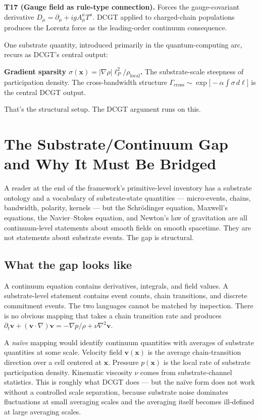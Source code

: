 \documentclass[11pt,a4paper]{article}
\begin{document}
\textbf{T17 (Gauge field as rule-type connection).} Forces the gauge-covariant derivative $D_\mu = \partial_\mu + igA_\mu^a T^a$. DCGT applied to charged-chain populations produces the Lorentz force as the leading-order continuum consequence.

One substrate quantity, introduced primarily in the quantum-computing arc, recurs as DCGT's central output:

\textbf{Gradient sparsity $\sigma(\mathbf{x}) = |\nabla\rho|\ell_P^2/\rho_{\mathrm{local}}$.} The substrate-scale steepness of participation density. The cross-bandwidth structure $\Gamma_{\mathrm{cross}} \sim \exp\bigl[-\alpha \int \sigma\, d\ell\bigr]$ is the central DCGT output.

That's the structural setup. The DCGT argument runs on this.

\section{The Substrate/Continuum Gap and Why It Must Be Bridged}

A reader at the end of the framework's primitive-level inventory has a substrate ontology and a vocabulary of substrate-state quantities --- micro-events, chains, bandwidth, polarity, kernels --- but the Schr\"odinger equation, Maxwell's equations, the Navier--Stokes equation, and Newton's law of gravitation are all continuum-level statements about smooth fields on smooth spacetime. They are not statements about substrate events. The gap is structural.

\subsection{What the gap looks like}

A continuum equation contains derivatives, integrals, and field values. A substrate-level statement contains event counts, chain transitions, and discrete commitment events. The two languages cannot be matched by inspection. There is no obvious mapping that takes a chain transition rate and produces $\partial_t \mathbf{v} + (\mathbf{v} \cdot \nabla)\mathbf{v} = -\nabla p / \rho + \nu \nabla^2 \mathbf{v}$.

A \emph{na\"ive} mapping would identify continuum quantities with averages of substrate quantities at some scale. Velocity field $\mathbf{v}(\mathbf{x})$ is the average chain-transition direction over a cell centered at $\mathbf{x}$. Pressure $p(\mathbf{x})$ is the local rate of substrate participation density. Kinematic viscosity $\nu$ comes from substrate-channel statistics. This is roughly what DCGT does --- but the na\"ive form does not work without a controlled scale separation, because substrate noise dominates fluctuations at small averaging scales and the averaging itself becomes ill-defined at large averaging scales.
\end{document}
